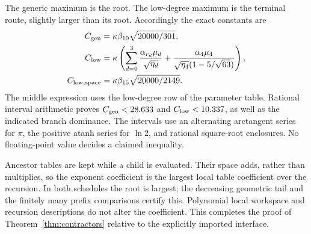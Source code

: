 The generic maximum is the root. The low-degree maximum is the terminal
route, slightly larger than its root. Accordingly the exact constants are
\begin{align*}
 C_{\rm gen}&=\kappa\beta_{10}\sqrt{20000/301},\\
 C_{\rm low}&=\kappa\left(
  \sum_{d=0}^3\frac{\alpha_{r_d}\mu_d}{\sqrt{\eta_d}}
  +\frac{\alpha_4\mu_4}{\sqrt{\eta_4}(1-5/\sqrt{63})}\right),\\
 C_{\rm low,space}&=\kappa\beta_{15}\sqrt{20000/2149}.
\end{align*}
The middle expression uses the low-degree row of the parameter table.
Rational interval arithmetic proves $C_{\rm gen}<28.633$ and
$C_{\rm low}<10.337$, as well as the indicated branch dominance.
The intervals use an alternating arctangent series for $\pi$, the
positive atanh series for $\ln2$, and rational square-root enclosures.
No floating-point value decides a claimed inequality.

Ancestor tables are kept while a child is evaluated. Their space adds,
rather than multiplies, so the exponent coefficient is the largest
local table coefficient over the recursion. In both schedules the root
is largest; the decreasing geometric tail and the finitely many prefix
comparisons certify this. Polynomial local workspace and recursion
descriptions do not alter the coefficient. This completes the proof of
Theorem~\ref{thm:contractors} relative to the explicitly imported interface.

